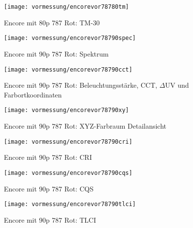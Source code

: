 \documentclass[pagesize,paper=A4,fontsize=12pt,utf8,numbers=noenddot,bibliography=totoc,listof=totoc,DIV=11,BCOR=1mm]{scrreprt}
\begin{document}
\begin{figure}[htp]     %
\centering
\texttt{[image: vormessung/encorevor78780tm]} 
\caption {Encore mit 80p 787 Rot: TM-30} 
\end{figure}




\begin{figure}[htp]     %
\centering
\texttt{[image: vormessung/encorevor78790spec]} 
\caption {Encore mit 90p 787 Rot: Spektrum} 
\end{figure}

\begin{figure}[htp]     %
\centering
\texttt{[image: vormessung/encorevor78790cct]} 
\caption {Encore mit 90p 787 Rot: Beleuchtungsstärke, CCT, $\Delta$UV und Farbortkoordinaten} 
\end{figure}

\begin{figure}[htp]     %
\centering
\texttt{[image: vormessung/encorevor78790xy]} 
\caption {Encore mit 90p 787 Rot: XYZ-Farbraum Detailansicht} 
\end{figure}

\begin{figure}[htp]     %
\centering
\texttt{[image: vormessung/encorevor78790cri]} 
\caption {Encore mit 90p 787 Rot: CRI} 
\end{figure}

\begin{figure}[htp]     %
\centering
\texttt{[image: vormessung/encorevor78790cqs]} 
\caption {Encore mit 90p 787 Rot: CQS} 
\end{figure}

\begin{figure}[htp]     %
\centering
\texttt{[image: vormessung/encorevor78790tlci]} 
\caption {Encore mit 90p 787 Rot: TLCI} 
\end{figure}
\end{document}
